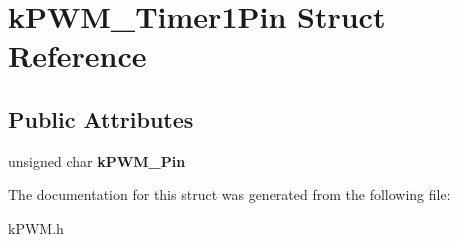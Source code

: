 \hypertarget{structkPWM__Timer1Pin}{}\section{k\+P\+W\+M\+\_\+\+Timer1\+Pin Struct Reference}
\label{structkPWM__Timer1Pin}
\subsection*{Public Attributes}
\begin{DoxyCompactItemize}
\item 
unsigned char {\bfseries k\+P\+W\+M\+\_\+\+Pin}\hypertarget{structkPWM__Timer1Pin_a70bf1caebd445175377ea8e2d7f26f8b}{}\label{structkPWM__Timer1Pin_a70bf1caebd445175377ea8e2d7f26f8b}

\end{DoxyCompactItemize}


The documentation for this struct was generated from the following file\+:\begin{DoxyCompactItemize}
\item 
k\+P\+W\+M.\+h\end{DoxyCompactItemize}
